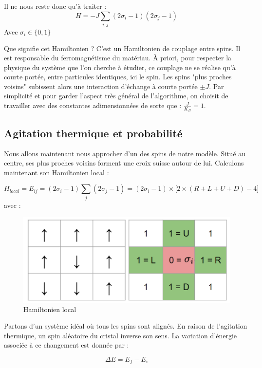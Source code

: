 \documentclass[11pt, parskip=half]{scrartcl} %
\begin{document}
Il ne nous reste donc qu'à traiter :
\begin{equation*}
	H = -J  \displaystyle \sum_{i,j}(2\sigma_{i}-1)(2\sigma_{j}-1)
\end{equation*}
Avec $\sigma_{i} \in \{0,1\}$

Que signifie cet Hamiltonien ? C'est un Hamiltonien de couplage entre spins. Il est responsable du ferromagnétisme du matériau. À priori, pour respecter la physique du système que l'on cherche à étudier, ce couplage ne se réalise qu'à courte portée, entre particules identiques, ici le spin. Les spins "plus proches voisins" subissent alors une interaction d'échange à courte portée $\pm J$. Par simplicité et pour garder l'aspect très général de l'algorithme, on choisit de travailler avec des constantes adimensionnées de sorte que : $\frac{J}{K_B} = 1$.

\subsection{Agitation thermique et probabilité}
Nous allons maintenant nous approcher d'un des spins de notre modèle. Situé au centre, ses plus proches voisins forment une croix suisse autour de lui. Calculons maintenant son Hamiltonien local :

\begin{equation*}
	H_{local} = E_{ij} =  (2\sigma_{i}-1) \displaystyle \sum_{j}(2\sigma_{j}-1) = (2\sigma_{i}-1) \times \bigg[ 2\times( R + L + U + D ) -4 \bigg]
\end{equation*}
avec :

\begin{figure}[h]
	\centering
	\includegraphics[width=0.5\linewidth]{./figures/H.png}
	\caption{Hamiltonien local}
	\label{fig:H}
\end{figure}

Partons d'un système idéal où tous les spins sont alignés. En raison de l'agitation thermique, un spin aléatoire du cristal inverse son sens. La variation d'énergie associée à ce changement est donnée par :

\begin{equation*}
	\Delta E = E_f - E_i
\end{equation*}
\end{document}
